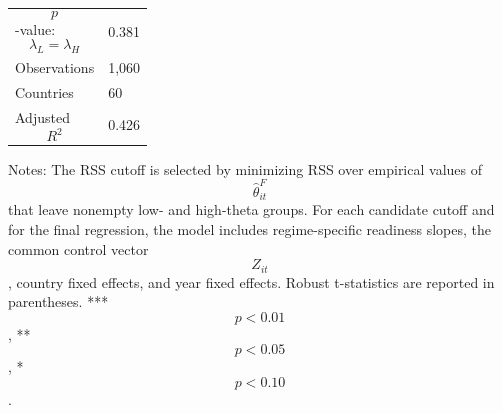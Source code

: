 \begin{table}[H]
\begin{threeparttable}
\begin{tabularx}{\textwidth}{lY}
$$p$$-value: $$\lambda_L=\lambda_H$$ & 0.381 \\
Observations & 1,060 \\
Countries & 60 \\
Adjusted $$R^2$$ & 0.426 \\
\bottomrule
\end{tabularx}
\begin{tablenotes}[flushleft]\footnotesize
\item Notes: The RSS cutoff is selected by minimizing RSS over empirical values of $$\widehat{\theta}^{F}_{it}$$ that leave nonempty low- and high-theta groups. For each candidate cutoff and for the final regression, the model includes regime-specific readiness slopes, the common control vector $$Z_{it}$$, country fixed effects, and year fixed effects. Robust t-statistics are reported in parentheses. *** $$p<0.01$$, ** $$p<0.05$$, * $$p<0.10$$.
\end{tablenotes}
\end{threeparttable}
\end{table}
